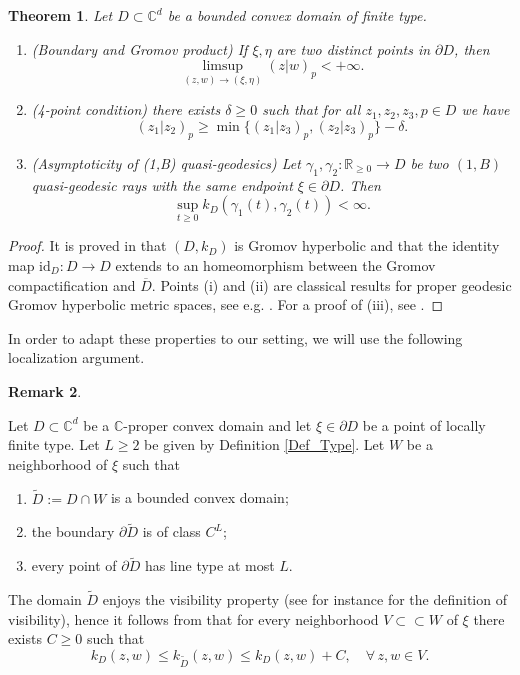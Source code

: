 \documentclass[11pt, reqno]{amsart}
\numberwithin{equation}{section}
\newtheorem{theorem}{Theorem}[section]
\theoremstyle{definition}
\newtheorem{remark}[theorem]{Remark}
\newcommand{\C}{\mathbb{C}}
\newcommand{\R}{\mathbb{R}}
\newcommand{\id}{\mathrm{id}}
\begin{document}
	\begin{theorem}\label{shadowingft}
		Let $D\subset \C^d$ be a bounded convex domain of finite type. 
		\begin{enumerate}
			
			\item[(i)] (Boundary and Gromov product) If $\xi,\eta$ are two distinct points in $\partial D$, then 
			$$\limsup_{(z,w)\to(\xi,\eta)}(z|w)_p<+\infty.$$
			
			\item[(ii)] \label{4point}  (4-point condition) there exists $\delta\geq 0$ such that for all $z_1,z_2,z_3,p\in D$ we have
			$$(z_1|z_2)_p\geq\min\{(z_1|z_3)_p,(z_2|z_3)_p\}-\delta.$$
			
			\item[(iii)] (Asymptoticity of (1,B) quasi-geodesics)  Let $\gamma_1,\gamma_2\colon\R_{\geq 0}\to D$ be two $(1,B)$ quasi-geodesic rays with the same endpoint $\xi\in \partial D$. Then
			$$\sup_{t\geq0} k_D(\gamma_1(t),\gamma_2(t))<\infty.$$
		\end{enumerate}
		
	\end{theorem}
	\begin{proof}
		It is proved in \cite{Zim} that $(D,k_D)$ is Gromov hyperbolic and that the identity map $\id_D\colon D\to D$ extends to an homeomorphism between the Gromov compactification and $\overline D$.  
		Points (i) and (ii) are classical results for proper geodesic Gromov hyperbolic metric spaces, see e.g. \cite{BH,CDP}. For a proof of  (iii), see  \cite[Lemma 5.8]{AFGG}.
	\end{proof}
	
	
	
	In order to adapt these properties to our setting, we will use the following localization argument.
	\begin{remark}\label{localizationremark}
		
		Let $D\subset\C^d$ be a $\C$-proper convex domain and let $\xi\in\partial D$   be a point of  locally finite type.
		Let $L\geq 2$ be given by Definition \ref{Def_Type}. Let $W$ be a neighborhood of $\xi$ such that 
		\begin{enumerate}
			\item $\tilde{D}:=D\cap W$ is a bounded  convex domain;
			\item the boundary $\partial \tilde{D}$ is of class $C^L$;
			\item   every point of $\partial \tilde{D}$ has line type at most $L$.
		\end{enumerate}
		The domain  $\tilde D$ enjoys the visibility property (see for instance \cite{BNT} for the definition of visibility), hence it follows from  \cite[Theorem 1.4]{BNT} that  for every neighborhood  $V\subset\subset W$  of $\xi$  there exists $C\geq 0$ such that
		\begin{equation}\label{BNTloc}k_D(z,w)\leq k_{\tilde{D}}(z,w)\leq k_D(z,w)+C,\quad  \forall\, z,w\in V.\end{equation}
		
	\end{remark}
	
\end{document}
